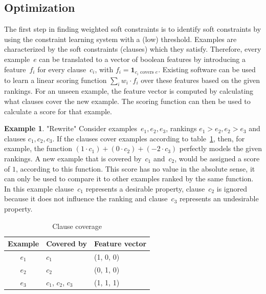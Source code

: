 \documentclass[letterpaper]{article}
\theoremstyle{definition}
\newtheorem{example}{Example}
\begin{document}

\subsection{Optimization}
The first step in finding weighted soft constraints is to identify soft constraints by using the constraint learning system with a (low) threshold.
Examples are characterized by the soft constraints (clauses) which they satisfy.
Therefore, every example~$e$ can be translated to a vector of boolean features by introducing a feature~$f_i$ for every clause~$c_i$, with $f_i = \mathbf{1}_{c_i \text{ covers } e}$.
Existing software can be used to learn a linear scoring function $\sum_i w_i \cdot f_i$ over these features based on the given rankings.
For an unseen example, the feature vector is computed by calculating what clauses cover the new example.
The scoring function can then be used to calculate a score for that example.

\begin{example} "Rewrite"
  Consider examples~$e_1, e_2, e_3$, rankings $e_1 > e_2, e_2 > e_3$ and clauses $c_1, c_2, c_3$.
  If the clauses cover examples according to table~\ref{tbl:cover_examples}, then, for example, the function $(1 \cdot c_1) + (0\cdot c_2) + (-2\cdot c_3)$ perfectly models the given rankings.
  A new example that is covered by~$c_1$ and~$c_2$, would be assigned a score of $1$, according to this function.
  This score has no value in the absolute sense, it can only be used to compare it to other examples ranked by the same function.
  In this example clause~$c_1$ represents a desirable property, clause~$c_2$ is ignored because it does not influence the ranking and clause~$c_3$ represents an undesirable property.

  \begin{table}
  \caption{Clause coverage}
  \label{tbl:cover_examples}
  \begin{tabularx}{\linewidth}{c|l|X}
    \textbf{Example} & \textbf{Covered by} & \textbf{Feature vector}\\
    \toprule
    $e_1$             & $c_1$               & (1, 0, 0) \\
    $e_2$             & $c_2$               & (0, 1, 0) \\
    $e_3$             & $c_1$, $c_2$, $c_3$ & (1, 1, 1) \\
  \end{tabularx}
  \end{table}
\end{example}
\end{document}
